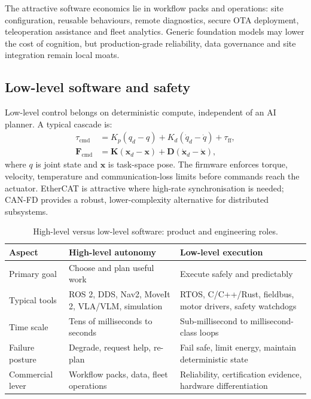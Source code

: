 \documentclass[11pt,a4paper]{article}
\begin{document}
The attractive software economics lie in workflow packs and operations: site configuration, reusable behaviours, remote diagnostics, secure OTA deployment, teleoperation assistance and fleet analytics. Generic foundation models may lower the cost of cognition, but production-grade reliability, data governance and site integration remain local moats.

\subsection{Low-level software and safety}

Low-level control belongs on deterministic compute, independent of an AI planner. A typical cascade is:
\begin{align}
 \tau_{\mathrm{cmd}} &= K_p(q_d-q)+K_d(\dot q_d-\dot q)+\tau_{\mathrm{ff}},\\
 \mathbf{F}_{\mathrm{cmd}} &= \mathbf{K}(\mathbf{x}_d-\mathbf{x})+\mathbf{D}(\dot{\mathbf{x}}_d-\dot{\mathbf{x}}),
\end{align}
where $q$ is joint state and $\mathbf{x}$ is task-space pose. The firmware enforces torque, velocity, temperature and communication-loss limits before commands reach the actuator. EtherCAT is attractive where high-rate synchronisation is needed; CAN-FD provides a robust, lower-complexity alternative for distributed subsystems.\cite{reachy}

\begin{table}[ht]
\centering\small
\caption{High-level versus low-level software: product and engineering roles.}
\begin{tabularx}{\textwidth}{@{}lYY@{}}
\toprule
Aspect & High-level autonomy & Low-level execution \\
\midrule
Primary goal & Choose and plan useful work & Execute safely and predictably \\
Typical tools & ROS 2, DDS, Nav2, MoveIt 2, VLA/VLM, simulation & RTOS, C/C++/Rust, fieldbus, motor drivers, safety watchdogs \\
Time scale & Tens of milliseconds to seconds & Sub-millisecond to millisecond-class loops \\
Failure posture & Degrade, request help, re-plan & Fail safe, limit energy, maintain deterministic state \\
Commercial lever & Workflow packs, data, fleet operations & Reliability, certification evidence, hardware differentiation \\
\bottomrule
\end{tabularx}
\end{table}
\end{document}
